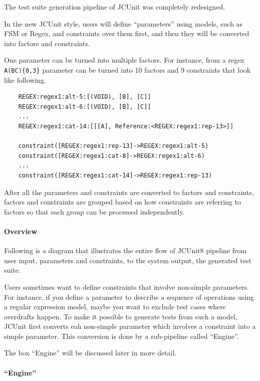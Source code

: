 The test suite generation pipeline of JCUnit was completely redesigned.

In the new JCUnit style, users will define ``parameters'' using models,
such as FSM or Regex, and constraints over them first, and then they
will be converted into factors and constraints.

One parameter can be turned into multiple factors. For instance, from a
regex \texttt{A(B\textbar{}C)\{0,3\}} parameter can be turned into 10
factors and 9 constraints that look like following.

\begin{verbatim}
    REGEX:regex1:alt-5:[(VOID), [B], [C]]
    REGEX:regex1:alt-6:[(VOID), [B], [C]]
    ...
    REGEX:regex1:cat-14:[[[A], Reference:<REGEX:regex1:rep-13>]]

    constraint([REGEX:regex1:rep-13]->REGEX:regex1:alt-5)
    constraint([REGEX:regex1:cat-8]->REGEX:regex1:alt-6)
    ...
    constraint([REGEX:regex1:cat-14]->REGEX:regex1:rep-13)
\end{verbatim}

After all the parameters and constraints are converted to factors and
constraints, factors and constraints are grouped based on how
constraints are referring to factors so that each group can be processed
independently.

\paragraph{Overview}\label{overview}

Following is a diagram that illustrates the entire flow of JCUnit8
pipeline from user input, parameters and constraints, to the system
output, the generated test suite.

Users sometimes want to define constraints that involve non-simple
parameters. For instance, if you define a parameter to describe a
sequence of operations using a regular expression model, maybe you want
to exclude test cases where overdrafts happen. To make it possible to
generate tests from such a model, JCUnit first converts eah non-simple
parameter which involves a constraint into a simple parameter. This
conversion is done by a sub-pipeline called ``Engine''.

The box ``Engine'' will be discussed later in more detail.

\paragraph{\texorpdfstring{``Engine''}{Engine}}\label{engine}

